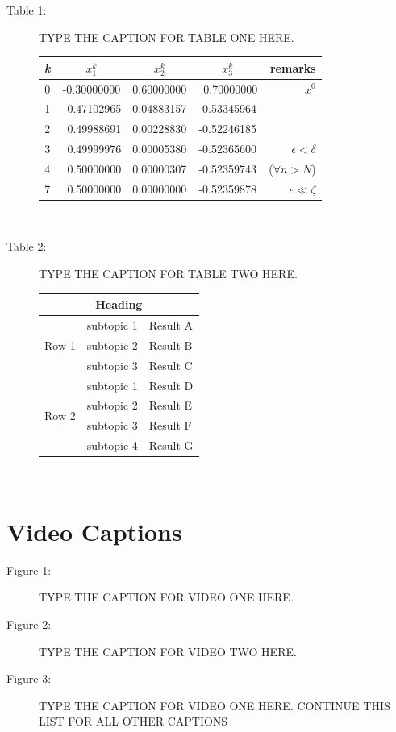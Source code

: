 \documentclass[preprint,5p]{elsarticle}
\begin{document}
\begin{description}
\item[Table 1:]  TYPE THE CAPTION FOR TABLE ONE HERE. \\

\begin{tabular}{|c||ccc||r|}
	\hline
\textbf{\em k}  &  $x_1^k$    &   $x_2^k$  & $x_3^k$ & remarks    \\
	\hline \hline
0   & -0.30000000 & 0.60000000 & ~0.70000000 & $x^0$ \\
1   & ~0.47102965 & 0.04883157 & -0.53345964 &   \\
2   & ~0.49988691 & 0.00228830 & -0.52246185 &   \\
3   & ~0.49999976 & 0.00005380 & -0.52365600 & $\epsilon<\delta$ \\
4   & ~0.50000000 & 0.00000307 & -0.52359743 & ($\forall n>N$) \\
	\hline
7   & ~0.50000000 & 0.00000000 & -0.52359878 & $\epsilon\ll\zeta$ \\
	\hline
\end{tabular} \\


\item[Table 2:]  TYPE THE CAPTION FOR TABLE TWO HERE. 

\begin{tabular}{|l|l|l|} \hline
\multicolumn{3}{|c|}{Heading} \\ \hline
\multirow{3}{*}{Row 1} & subtopic 1 & Result A \\
& subtopic 2 & Result B \\
& subtopic 3 & Result C \\ \hline
\multirow{4}{*}{Row 2} & subtopic 1 & Result D \\ 
& subtopic 2 & Result E \\
& subtopic 3 & Result F \\ 
& subtopic 4 & Result G \\ \hline
\end{tabular} \\

\end{description}



\pagebreak

\section*{Video Captions}

\begin{description}
\item[Figure 1:]  TYPE THE CAPTION FOR VIDEO ONE HERE.
\item[Figure 2:]  TYPE THE CAPTION FOR VIDEO TWO HERE.
\item[Figure 3:]  TYPE THE CAPTION FOR VIDEO ONE HERE.  CONTINUE THIS LIST FOR ALL OTHER CAPTIONS
\end{description}
\end{document}
